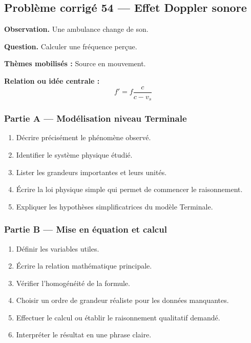 \documentclass[11pt,a4paper]{article}
\begin{document}
\subsection{Problème corrigé 54 — Effet Doppler sonore}

\begin{exercicebox}
\textbf{Observation.} Une ambulance change de son.

\medskip
\textbf{Question.} Calculer une fréquence perçue.

\medskip
\textbf{Thèmes mobilisés :} Source en mouvement.

\medskip
\textbf{Relation ou idée centrale :}
\[
f'=f\frac{c}{c-v_s}
\]
\end{exercicebox}

\subsubsection*{Partie A — Modélisation niveau Terminale}

\begin{enumerate}
  \item Décrire précisément le phénomène observé.
  \item Identifier le système physique étudié.
  \item Lister les grandeurs importantes et leurs unités.
  \item Écrire la loi physique simple qui permet de commencer le raisonnement.
  \item Expliquer les hypothèses simplificatrices du modèle Terminale.
\end{enumerate}

\subsubsection*{Partie B — Mise en équation et calcul}

\begin{enumerate}
  \item Définir les variables utiles.
  \item Écrire la relation mathématique principale.
  \item Vérifier l'homogénéité de la formule.
  \item Choisir un ordre de grandeur réaliste pour les données manquantes.
  \item Effectuer le calcul ou établir le raisonnement qualitatif demandé.
  \item Interpréter le résultat en une phrase claire.
\end{enumerate}
\end{document}
